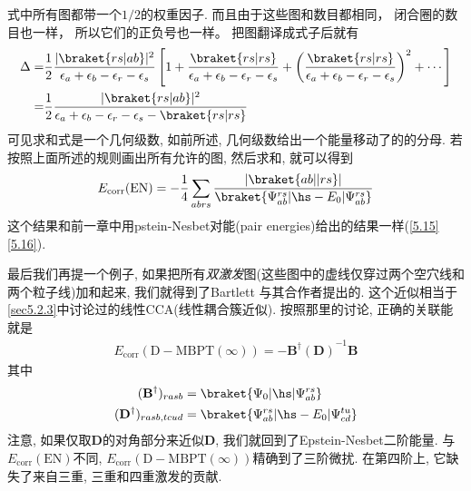 式中所有图都带一个$1/2$的权重因子. 
而且由于这些图和数目都相同，
闭合圈的数目也一样，
所以它们的正负号也一样。
把图翻译成式子后就有
\begin{align*}
\Delta =& \frac{1}{2}\frac{|\braket{rs|ab}|^2}{\epsilon_{a}+\epsilon_{b}-\epsilon_{r}-\epsilon_{s}}\left[ 1+ \frac{\braket{rs|rs}}{\epsilon_{a}+\epsilon_{b}-\epsilon_{r}-\epsilon_{s}}+ \left( \frac{\braket{rs|rs}}{\epsilon_{a}+\epsilon_{b}-\epsilon_{r}-\epsilon_{s}}\right)^2 + \cdots \right]\\
=& \frac{1}{2}\frac{|\braket{rs|ab}|^2}{\epsilon_{a}+\epsilon_{b}-\epsilon_{r}-\epsilon_{s} - \braket{rs|rs}}
\end{align*}
可见求和式是一个几何级数, 
如前所述, 
几何级数给出一个能量移动了的的分母. 
若按照上面所述的规则画出所有允许的图, 
然后求和, 
就可以得到
\begin{align}
E_\mathrm{corr}(\mathrm{EN}) = -\frac{1}{4}\sum_{abrs}\frac{|\braket{ab||rs}|}{\braket{\Psi_{ab}^{rs}|\hs-E_0|\Psi_{ab}^{rs}}}
\end{align}
这个结果和前一章中用pstein-Nesbet对能(pair energies)给出的结果一样(\autoref{5.15}\autoref{5.16}).


最后我们再提一个例子, 
如果把所有\emph{双激发}图(这些图中的虚线仅穿过两个空穴线和两个粒子线)加和起来, 
我们就得到了Bartlett
与其合作者提出的. 
这个近似相当于\autoref{sec5.2.3}中讨论过的线性CCA(线性耦合簇近似). 
按照那里的讨论, 
正确的关联能就是
\begin{align}
E_\mathrm{corr}(\mathrm{D-MBPT}(\infty)) = -\mathbf{B^\dagger(D)}^{-1}\mathbf{B}
\end{align}
其中
\begin{subequations}
\begin{align}
(\mathbf{B}^\dagger)_{rasb} &= \braket{\Psi_0|\hs|\Psi_{ab}^{rs}}\\
(\mathbf{D}^\dagger)_{rasb,tcud} &= \braket{\Psi_{ab}^{rs}|\hs-E_0|\Psi_{cd}^{tu}}
\end{align}
\end{subequations}
注意, 
如果仅取$\mathbf{D}$的对角部分来近似$\mathbf{D}$, 
我们就回到了Epstein-Nesbet二阶能量. 
与$E_\mathrm{corr}(\mathrm{EN})$不同, 
$E_\mathrm{corr}(\mathrm{D-MBPT}(\infty))$精确到了三阶微扰. 
在第四阶上, 
它缺失了来自三重, 
三重和四重激发的贡献.

